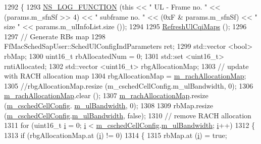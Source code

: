 \begin{DoxyCode}
1292 \{
1293   \hyperlink{log-macros-disabled_8h_a90b90d5bad1f39cb1b64923ea94c0761}{NS\_LOG\_FUNCTION} (\textcolor{keyword}{this} << \textcolor{stringliteral}{" UL - Frame no. "} << (params.m\_sfnSf >> 4) << \textcolor{stringliteral}{" subframe no. "} 
      << (0xF & params.m\_sfnSf) << \textcolor{stringliteral}{" size "} << params.m\_ulInfoList.size ());
1294 
1295   \hyperlink{classns3_1_1RrFfMacScheduler_ab28ac1b62c16252bfff55825dfbcd701}{RefreshUlCqiMaps} ();
1296 
1297   \textcolor{comment}{// Generate RBs map}
1298   FfMacSchedSapUser::SchedUlConfigIndParameters ret;
1299   std::vector <bool> rbMap;
1300   uint16\_t rbAllocatedNum = 0;
1301   std::set <uint16\_t> rntiAllocated;
1302   std::vector <uint16\_t> rbgAllocationMap;
1303   \textcolor{comment}{// update with RACH allocation map}
1304   rbgAllocationMap = \hyperlink{classns3_1_1RrFfMacScheduler_ac3a35483a21997065f49ff72707a90aa}{m\_rachAllocationMap};
1305   \textcolor{comment}{//rbgAllocationMap.resize (m\_cschedCellConfig.m\_ulBandwidth, 0);}
1306   \hyperlink{classns3_1_1RrFfMacScheduler_ac3a35483a21997065f49ff72707a90aa}{m\_rachAllocationMap}.clear ();
1307   \hyperlink{classns3_1_1RrFfMacScheduler_ac3a35483a21997065f49ff72707a90aa}{m\_rachAllocationMap}.resize (\hyperlink{classns3_1_1RrFfMacScheduler_a809c6237863709f97fc450b1a2ba60d4}{m\_cschedCellConfig}.
      \hyperlink{structns3_1_1FfMacCschedSapProvider_1_1CschedCellConfigReqParameters_a5ab5b102878e6e7e7727a14af4a64d2f}{m\_ulBandwidth}, 0);
1308 
1309   rbMap.resize (\hyperlink{classns3_1_1RrFfMacScheduler_a809c6237863709f97fc450b1a2ba60d4}{m\_cschedCellConfig}.\hyperlink{structns3_1_1FfMacCschedSapProvider_1_1CschedCellConfigReqParameters_a5ab5b102878e6e7e7727a14af4a64d2f}{m\_ulBandwidth}, \textcolor{keyword}{false});
1310   \textcolor{comment}{// remove RACH allocation}
1311   \textcolor{keywordflow}{for} (uint16\_t \hyperlink{bernuolliDistribution_8m_a6f6ccfcf58b31cb6412107d9d5281426}{i} = 0; \hyperlink{bernuolliDistribution_8m_a6f6ccfcf58b31cb6412107d9d5281426}{i} < \hyperlink{classns3_1_1RrFfMacScheduler_a809c6237863709f97fc450b1a2ba60d4}{m\_cschedCellConfig}.\hyperlink{structns3_1_1FfMacCschedSapProvider_1_1CschedCellConfigReqParameters_a5ab5b102878e6e7e7727a14af4a64d2f}{m\_ulBandwidth}; 
      \hyperlink{bernuolliDistribution_8m_a6f6ccfcf58b31cb6412107d9d5281426}{i}++)
1312     \{
1313       \textcolor{keywordflow}{if} (rbgAllocationMap.at (\hyperlink{bernuolliDistribution_8m_a6f6ccfcf58b31cb6412107d9d5281426}{i}) != 0)
1314         \{
1315           rbMap.at (\hyperlink{bernuolliDistribution_8m_a6f6ccfcf58b31cb6412107d9d5281426}{i}) = \textcolor{keyword}{true};

\end{DoxyCode}
